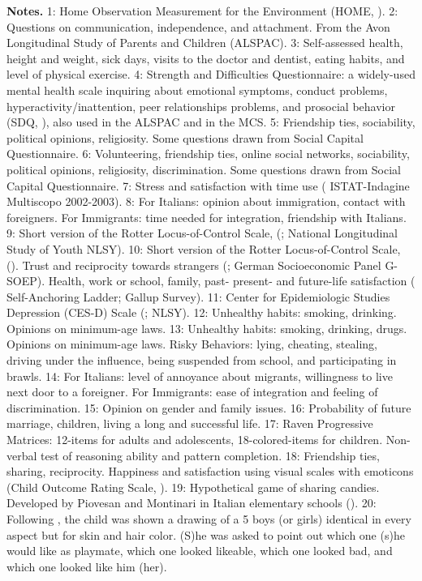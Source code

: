 \documentclass{article}
\begin{document}
\begin{table}
\scriptsize{{\bfseries Notes.} 1: Home Observation Measurement for the Environment (HOME, \cite{Caldwell1984}). 2: Questions on communication, independence, and attachment. From the Avon Longitudinal Study of Parents and Children (ALSPAC). 3: Self-assessed health, height and weight, sick days, visits to the doctor and dentist, eating habits, and level of physical exercise. 4: Strength and Difficulties Questionnaire: a widely-used mental health scale inquiring about emotional symptoms, conduct problems, hyperactivity/inattention, peer relationships problems, and prosocial behavior (SDQ, \cite{Goodman1997}), also used in the ALSPAC and in the MCS. 5: Friendship ties, sociability, political opinions, religiosity. Some questions drawn from \cite{Onyx2000} Social Capital Questionnaire. 6: Volunteering, friendship ties, online social networks, sociability, political opinions, religiosity, discrimination. Some questions drawn from \cite{Onyx2000} Social Capital Questionnaire. 7: Stress and satisfaction with time use (\cite{ISTAT} ISTAT-Indagine Multiscopo 2002-2003). 8: For Italians: opinion about immigration, contact with foreigners. For Immigrants: time needed for integration, friendship with Italians. 9: Short version of the Rotter Locus-of-Control Scale, (\cite{Rotter1966}; National Longitudinal Study of Youth NLSY). 10: Short version of the Rotter Locus-of-Control Scale, (\cite{Rotter1966}). Trust and reciprocity towards strangers (\cite{Dohmen2008}; German Socioeconomic Panel G-SOEP). Health, work or school, family, past- present- and future-life satisfaction (\cite{Cantril1965} Self-Anchoring Ladder; Gallup Survey). 11: Center for Epidemiologic Studies Depression (CES-D) Scale (\cite{Radloff1977}; NLSY). 12: Unhealthy habits: smoking, drinking. Opinions on minimum-age laws. 13: Unhealthy habits: smoking, drinking, drugs. Opinions on minimum-age laws. Risky Behaviors: lying, cheating, stealing, driving under the influence, being suspended from school, and participating in brawls. 14: For Italians: level of annoyance about migrants, willingness to live next door to a foreigner. For Immigrants: ease of integration and feeling of discrimination. 15: Opinion on gender and family issues. 16: Probability of future marriage, children, living a long and successful life. 17: Raven Progressive Matrices: 12-items for adults and adolescents, 18-colored-items for children. Non-verbal test of reasoning ability and pattern completion. 18: Friendship ties, sharing, reciprocity. Happiness and satisfaction using visual scales with emoticons (Child Outcome Rating Scale, \cite{Duncan2003a}). 19: Hypothetical game of sharing candies. Developed by Piovesan and Montinari in Italian elementary schools (\cite{Shaw2014}). 20: Following \cite{Clark1947}, the child was shown a drawing of a 5 boys (or girls) identical in every aspect but for skin and hair color. (S)he was asked to point out which one (s)he would like as playmate, which one looked likeable, which one looked bad, and which one looked like him (her).}
\end{table}
\end{document}
